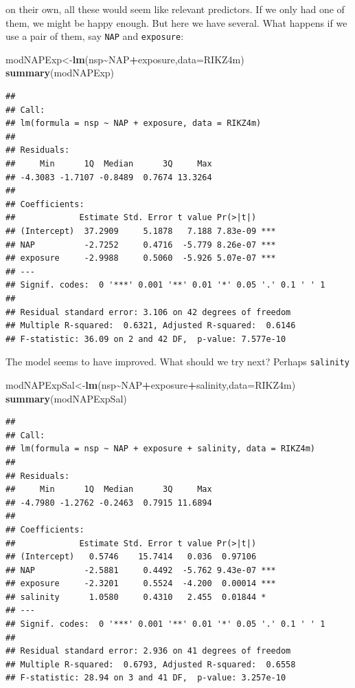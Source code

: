 \documentclass[
]{book}
\newenvironment{Shaded}{\begin{snugshade}}{\end{snugshade}}
\newcommand{\AttributeTok}[1]{\textcolor[rgb]{0.13,0.29,0.53}{#1}}
\newcommand{\FunctionTok}[1]{\textcolor[rgb]{0.13,0.29,0.53}{\textbf{#1}}}
\newcommand{\NormalTok}[1]{#1}
\newcommand{\OtherTok}[1]{\textcolor[rgb]{0.56,0.35,0.01}{#1}}
\newcommand{\SpecialCharTok}[1]{\textcolor[rgb]{0.81,0.36,0.00}{\textbf{#1}}}
\begin{document}
on their own, all these would seem like relevant predictors. If we only had one of them, we might be happy enough. But here we have several. What happens if we use a pair of them, say \texttt{NAP} and \texttt{exposure}:

\begin{Shaded}
\begin{Highlighting}[]
\NormalTok{modNAPExp}\OtherTok{\textless{}{-}}\FunctionTok{lm}\NormalTok{(nsp}\SpecialCharTok{\textasciitilde{}}\NormalTok{NAP}\SpecialCharTok{+}\NormalTok{exposure,}\AttributeTok{data=}\NormalTok{RIKZ4m)}
\FunctionTok{summary}\NormalTok{(modNAPExp)}
\end{Highlighting}
\end{Shaded}

\begin{verbatim}
## 
## Call:
## lm(formula = nsp ~ NAP + exposure, data = RIKZ4m)
## 
## Residuals:
##     Min      1Q  Median      3Q     Max 
## -4.3083 -1.7107 -0.8489  0.7674 13.3264 
## 
## Coefficients:
##             Estimate Std. Error t value Pr(>|t|)    
## (Intercept)  37.2909     5.1878   7.188 7.83e-09 ***
## NAP          -2.7252     0.4716  -5.779 8.26e-07 ***
## exposure     -2.9988     0.5060  -5.926 5.07e-07 ***
## ---
## Signif. codes:  0 '***' 0.001 '**' 0.01 '*' 0.05 '.' 0.1 ' ' 1
## 
## Residual standard error: 3.106 on 42 degrees of freedom
## Multiple R-squared:  0.6321, Adjusted R-squared:  0.6146 
## F-statistic: 36.09 on 2 and 42 DF,  p-value: 7.577e-10
\end{verbatim}

The model seems to have improved. What should we try next? Perhaps \texttt{salinity}

\begin{Shaded}
\begin{Highlighting}[]
\NormalTok{modNAPExpSal}\OtherTok{\textless{}{-}}\FunctionTok{lm}\NormalTok{(nsp}\SpecialCharTok{\textasciitilde{}}\NormalTok{NAP}\SpecialCharTok{+}\NormalTok{exposure}\SpecialCharTok{+}\NormalTok{salinity,}\AttributeTok{data=}\NormalTok{RIKZ4m)}
\FunctionTok{summary}\NormalTok{(modNAPExpSal)}
\end{Highlighting}
\end{Shaded}

\begin{verbatim}
## 
## Call:
## lm(formula = nsp ~ NAP + exposure + salinity, data = RIKZ4m)
## 
## Residuals:
##     Min      1Q  Median      3Q     Max 
## -4.7980 -1.2762 -0.2463  0.7915 11.6894 
## 
## Coefficients:
##             Estimate Std. Error t value Pr(>|t|)    
## (Intercept)   0.5746    15.7414   0.036  0.97106    
## NAP          -2.5881     0.4492  -5.762 9.43e-07 ***
## exposure     -2.3201     0.5524  -4.200  0.00014 ***
## salinity      1.0580     0.4310   2.455  0.01844 *  
## ---
## Signif. codes:  0 '***' 0.001 '**' 0.01 '*' 0.05 '.' 0.1 ' ' 1
## 
## Residual standard error: 2.936 on 41 degrees of freedom
## Multiple R-squared:  0.6793, Adjusted R-squared:  0.6558 
## F-statistic: 28.94 on 3 and 41 DF,  p-value: 3.257e-10
\end{verbatim}
\end{document}
